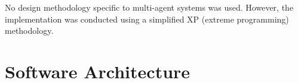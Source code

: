 \documentclass{llncs2e/llncs}
\begin{document}
    No design methodology specific to multi-agent systems was used. However, 
    the implementation was conducted using a simplified XP (extreme programming) 
    methodology.


\section{Software Architecture}

\end{document}
